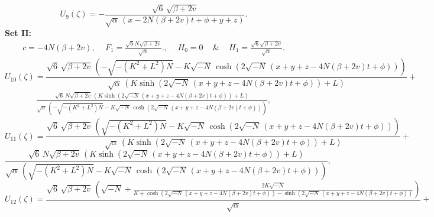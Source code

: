 \documentclass[10pt]{NSP1}
\numberwithin{equation}{section}
\begin{document}
\begin{equation}\label{U9}
    U_{9} \! \left(\zeta \right) =
-\frac{\sqrt{6}\, \sqrt{\beta +2 v}}{\sqrt{\alpha}\, \left(x -2 N \left(\beta +2 v \right) t +\phi +y +z \right)}.
\end{equation}
\textbf{Set II:}
\begin{eqnarray}\label{set2}
c = -4N(\beta+2v),\quad\,F_{1} = \frac{\sqrt{6}N\sqrt{\beta+2v}}{\sqrt{\alpha}}.,\quad\, H_{0} = 0\quad\,{\&}\quad\,H_{1} = \frac{\sqrt{6}\sqrt{\beta+2v}}{\sqrt{\alpha}}.
\end{eqnarray}
\begin{equation}\label{U10}
    U_{10}\! \left(\zeta \right) =
\frac{\sqrt{6}\, \sqrt{\beta +2 v}\, \left(-\sqrt{-\left(K^{2}+L^{2}\right) N}-K \sqrt{-N}\, \cosh \! \left(2 \sqrt{-N}\, \left(x +y +z -4 N \left(\beta +2 v \right) t +\phi \right)\right)\right)}{\sqrt{\alpha}\, \left(K \sinh \! \left(2 \sqrt{-N}\, \left(x +y +z -4 N \left(\beta +2 v \right) t +\phi \right)\right)+L \right)}+\nonumber
\end{equation}
\begin{eqnarray}
\frac{\sqrt{6}\, N \sqrt{\beta +2 v}\, \left(K \sinh \! \left(2 \sqrt{-N}\, \left(x +y +z -4 N \left(\beta +2 v \right) t +\phi \right)\right)+L \right)}{\sqrt{\alpha}\, \left(-\sqrt{-\left(K^{2}+L^{2}\right) N}-K \sqrt{-N}\, \cosh \! \left(2 \sqrt{-N}\, \left(x +y +z -4 N \left(\beta +2 v \right) t +\phi \right)\right)\right)},
\end{eqnarray}
\begin{equation}\label{U11}
    U_{11}\! \left(\zeta \right) =
\frac{\sqrt{6}\, \sqrt{\beta +2 v}\, \left(\sqrt{-\left(K^{2}+L^{2}\right) N}-K \sqrt{-N}\, \cosh \! \left(2 \sqrt{-N}\, \left(x +y +z -4 N \left(\beta +2 v \right) t +\phi \right)\right)\right)}{\sqrt{\alpha}\, \left(K \sinh \! \left(2 \sqrt{-N}\, \left(x +y +z -4 N \left(\beta +2 v \right) t +\phi \right)\right)+L \right)}+\nonumber
\end{equation}
\begin{equation}
\frac{\sqrt{6}\, N \sqrt{\beta +2 v}\, \left(K \sinh \! \left(2 \sqrt{-N}\, \left(x +y +z -4 N \left(\beta +2 v \right) t +\phi \right)\right)+L \right)}{\sqrt{\alpha}\, \left(\sqrt{-\left(K^{2}+L^{2}\right) N}-K \sqrt{-N}\, \cosh \! \left(2 \sqrt{-N}\, \left(x +y +z -4 N \left(\beta +2 v \right) t +\phi \right)\right)\right)},
\end{equation}
\begin{equation}\label{U12}
    U_{12}\! \left(\zeta \right) =
\frac{\sqrt{6}\, \sqrt{\beta +2 v}\, \left(\sqrt{-N}+\frac{2 K \sqrt{-N}}{K +\cosh \left(2 \sqrt{-N}\, \left(x +y +z -4 N \left(\beta +2 v \right) t +\phi \right)\right)-\sinh \left(2 \sqrt{-N}\, \left(x +y +z -4 N \left(\beta +2 v \right) t +\phi \right)\right)}\right)}{\sqrt{\alpha}}+\nonumber
\end{equation}
\end{document}
